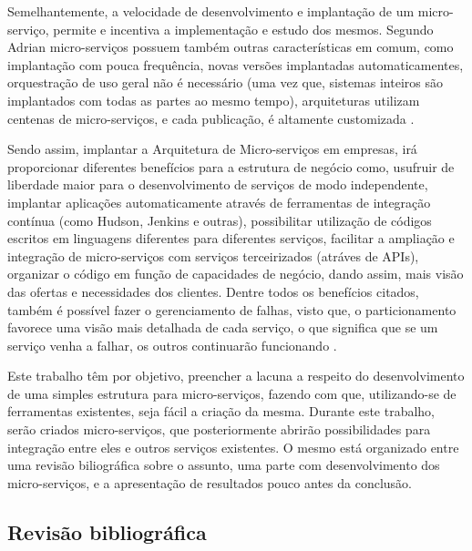 \documentclass[journal]{IEEEtran}
\begin{document}
Semelhantemente, a velocidade de desenvolvimento e implantação de um micro-serviço, permite e incentiva a implementação e estudo dos mesmos. Segundo Adrian micro-serviços possuem também outras características em comum, como implantação com pouca frequência, novas versões implantadas automaticamentes, orquestração de uso geral não é necessário (uma vez que, sistemas inteiros são implantados com todas as partes ao mesmo tempo), arquiteturas utilizam centenas de micro-serviços, e cada publicação, é altamente customizada \cite{JanStenberg}.

Sendo assim, implantar a Arquitetura de Micro-serviços em empresas, irá proporcionar diferentes benefícios para a estrutura de negócio como, usufruir de liberdade maior para o desenvolvimento de serviços de modo independente, implantar aplicações automaticamente através de ferramentas de integração contínua (como Hudson, Jenkins e outras), possibilitar utilização de códigos escritos em linguagens diferentes para diferentes serviços, facilitar a ampliação e integração de micro-serviços com serviços terceirizados (atráves de APIs), organizar o código em função de capacidades de negócio, dando assim, mais visão das ofertas e necessidades dos clientes. Dentre todos os benefícios citados, também é possível fazer o gerenciamento de falhas, visto que, o particionamento favorece uma visão mais detalhada de cada serviço, o que significa que se um serviço venha a falhar, os outros continuarão funcionando \cite{RicardoPeloi}.

Este trabalho têm por objetivo, preencher a lacuna a respeito do desenvolvimento de uma simples estrutura para micro-serviços, fazendo com que, utilizando-se de ferramentas existentes, seja fácil a criação da mesma. Durante este trabalho, serão criados micro-serviços, que posteriormente abrirão possibilidades para integração entre eles e outros serviços existentes. O mesmo está organizado entre uma revisão biliográfica sobre o assunto, uma parte com desenvolvimento dos micro-serviços, e a apresentação de resultados pouco antes da conclusão.


\subsection{Revisão bibliográfica}
\end{document}
